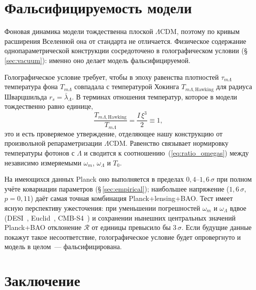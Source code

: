 \documentclass[12pt,a4paper]{article}
\begin{document}
\section{Фальсифицируемость модели}
\label{sec:falsif}

Фоновая динамика модели тождественна плоской $\Lambda$CDM, поэтому по кривым расширения Вселенной она от стандарта не отличается. Физическое содержание однопараметрической конструкции сосредоточено в голографическом условии (\S\,\ref{sec:vacuum}): именно оно делает модель фальсифицируемой.

Голографическое условие требует, чтобы в эпоху равенства плотностей $\tau_{m\Lambda}$ температура фона $T_{m\Lambda}$ совпадала с температурой Хокинга $T_{m\Lambda\mathrm{, Hawking}}$ для радиуса Шварцшильда $r_s=\bar\lambda_\Lambda$. В терминах отношения температур, которое в модели тождественно равно единице,
\begin{equation}
\frac{T_{m\Lambda\mathrm{, Hawking}}}{T_{m\Lambda}} = \frac{I\,\xi^3}{2} \equiv 1,
\end{equation}
это и есть проверяемое утверждение, отделяющее нашу конструкцию от произвольной репараметризации $\Lambda$CDM. Равенство связывает нормировку температуры фотонов с $\Lambda$ и сводится к соотношению~(\ref{eq:ratio_omegas}) между независимо измеряемыми $\omega_m$, $\omega_\Lambda$ и $T_0$.

На имеющихся данных Planck оно выполняется в пределах $0{,}4$--$1{,}6\,\sigma$ при полном учёте ковариации параметров (\S\,\ref{sec:empirical}); наибольшее напряжение ($1{,}6\,\sigma$, $p=0{,}11$) даёт самая точная комбинация Planck+lensing+BAO. Тест имеет ясную перспективу ужесточения: при уменьшении погрешностей $\omega_m$ и $\omega_\Lambda$ вдвое (DESI~\cite{DESI2024SV}, Euclid~\cite{Laureijs2011,Euclid2020}, CMB-S4~\cite{Abazajian2016}) и сохранении нынешних центральных значений Planck+BAO отклонение $\mathcal{R}$ от единицы превысило бы $3\,\sigma$. Если будущие данные покажут такое несоответствие, голографическое условие будет опровергнуто и модель в целом~--- фальсифицирована.

\section{Заключение}
\end{document}
